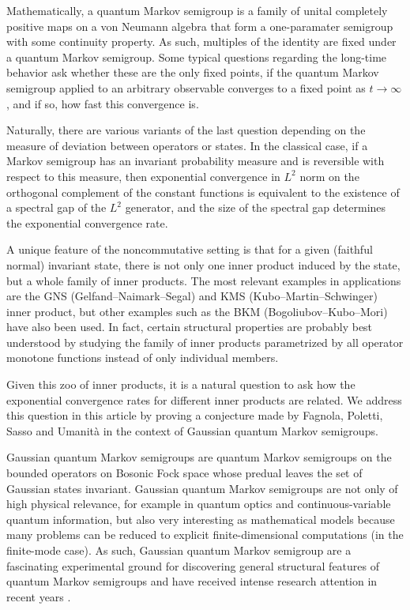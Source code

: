 \documentclass[a4paper,12pt]{amsart}
\theoremstyle{plain}
\theoremstyle{remark}
\theoremstyle{definition}
\begin{document}
Mathematically, a quantum Markov semigroup is a family of unital completely positive maps on a von Neumann algebra that form a one-paramater semigroup with some continuity property. As such, multiples of the identity are fixed under a quantum Markov semigroup. Some typical questions regarding the long-time behavior ask whether these are the only fixed points, if the quantum Markov semigroup applied to an arbitrary observable converges to a fixed point as $t\to\infty$, and if so, how fast this convergence is.

Naturally, there are various variants of the last question depending on the measure of deviation between operators or states. In the classical case, if a Markov semigroup has an invariant probability measure and is reversible with respect to this measure, then exponential convergence in $L^2$ norm on the orthogonal complement of the constant functions is equivalent to the existence of a spectral gap of the $L^2$ generator, and the size of the spectral gap determines the exponential convergence rate.

A unique feature of the noncommutative setting is that for a given (faithful normal) invariant state, there is not only one inner product induced by the state, but a whole family of inner products. The most relevant examples in applications are the GNS (Gelfand--Naimark--Segal) and KMS (Kubo--Martin--Schwinger) inner product, but other examples such as the BKM (Bogoliubov--Kubo--Mori) have also been used. In fact, certain structural properties are probably best understood by studying the family of inner products parametrized by all operator monotone functions instead of only individual members.

Given this zoo of inner products, it is a natural question to ask how the exponential convergence rates for different inner products are related. We address this question in this article by proving a conjecture made by Fagnola, Poletti, Sasso and Umanità \cite{FPSU25} in the context of Gaussian quantum Markov semigroups.

Gaussian quantum Markov semigroups are quantum Markov semigroups on the bounded operators on Bosonic Fock space whose predual leaves the set of Gaussian states invariant. Gaussian quantum Markov semigroups are not only of high physical relevance, for example in quantum optics and continuous-variable quantum information, but also very interesting as mathematical models because many problems can be reduced to explicit finite-dimensional computations (in the finite-mode case). As such, Gaussian quantum Markov semigroup are a fascinating experimental ground for discovering general structural features of quantum Markov semigroups and have received intense research attention in recent years \cite{AFP21,AFP22a,AFP22b,Pol22,FP24,FL25,GP26}.
\end{document}
